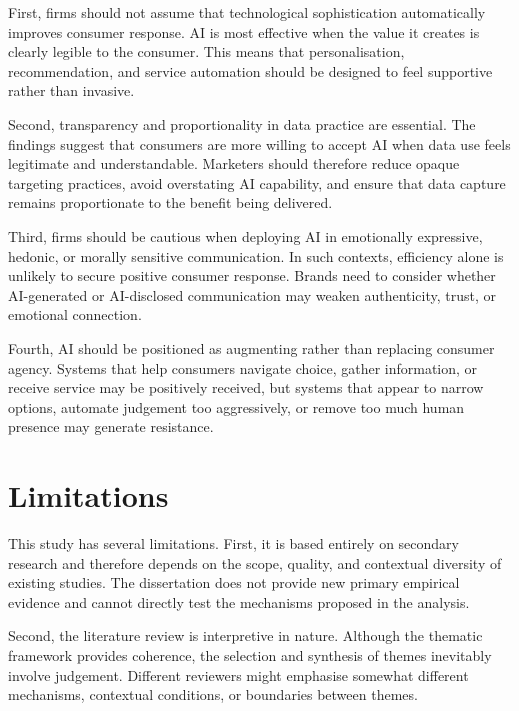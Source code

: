 First, firms should not assume that technological sophistication automatically improves consumer response. AI is most effective when the value it creates is clearly legible to the consumer. This means that personalisation, recommendation, and service automation should be designed to feel supportive rather than invasive.

Second, transparency and proportionality in data practice are essential. The findings suggest that consumers are more willing to accept AI when data use feels legitimate and understandable. Marketers should therefore reduce opaque targeting practices, avoid overstating AI capability, and ensure that data capture remains proportionate to the benefit being delivered.

Third, firms should be cautious when deploying AI in emotionally expressive, hedonic, or morally sensitive communication. In such contexts, efficiency alone is unlikely to secure positive consumer response. Brands need to consider whether AI-generated or AI-disclosed communication may weaken authenticity, trust, or emotional connection.

Fourth, AI should be positioned as augmenting rather than replacing consumer agency. Systems that help consumers navigate choice, gather information, or receive service may be positively received, but systems that appear to narrow options, automate judgement too aggressively, or remove too much human presence may generate resistance.

\section{Limitations}
This study has several limitations. First, it is based entirely on secondary research and therefore depends on the scope, quality, and contextual diversity of existing studies. The dissertation does not provide new primary empirical evidence and cannot directly test the mechanisms proposed in the analysis.

Second, the literature review is interpretive in nature. Although the thematic framework provides coherence, the selection and synthesis of themes inevitably involve judgement. Different reviewers might emphasise somewhat different mechanisms, contextual conditions, or boundaries between themes.

